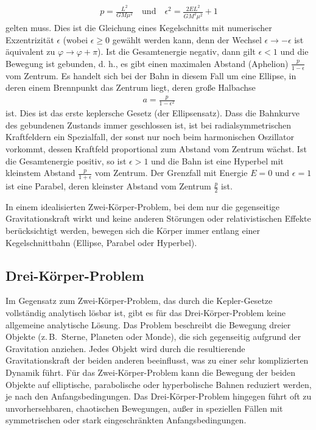 \documentclass[a4paper,12pt,twoside]{article}
\begin{document}
\begin{align*}
	p = \frac{L^2}{GM\mu^2} \quad \text{und} \quad \epsilon^2 = \frac{2E L^2}{GM^2 \mu^2} + 1
\end{align*}
gelten muss. Dies ist die Gleichung eines Kegelschnitts mit numerischer Exzentrizität \( \epsilon \) (wobei \( \epsilon \geq 0 \) gewählt werden kann, denn der Wechsel \( \epsilon \to -\epsilon \) ist äquivalent zu \( \varphi \to \varphi + \pi \)).
Ist die Gesamtenergie negativ, dann gilt \( \epsilon < 1 \) und die Bewegung ist gebunden, d. h., es gibt einen maximalen Abstand (Aphelion) \( \frac{p}{1 - \epsilon} \) vom Zentrum. Es handelt sich bei der Bahn in diesem Fall um eine Ellipse, in deren einem Brennpunkt das Zentrum liegt, deren große Halbachse
\begin{align*}
	a = \frac{p}{1 - \epsilon^2}
\end{align*}
ist. Dies ist das erste keplersche Gesetz (der Ellipsensatz). Dass die Bahnkurve des gebundenen Zustands immer geschlossen ist, ist bei radialsymmetrischen Kraftfeldern ein Spezialfall, der sonst nur noch beim harmonischen Oszillator vorkommt, dessen Kraftfeld proportional zum Abstand vom Zentrum wächst.
Ist die Gesamtenergie positiv, so ist \( \epsilon > 1 \) und die Bahn ist eine Hyperbel mit kleinstem Abstand \( \frac{p}{1 + \epsilon} \) vom Zentrum. Der Grenzfall mit Energie \( E = 0 \) und \( \epsilon = 1 \) ist eine Parabel, deren kleinster Abstand vom Zentrum \( \frac{p}{2} \) ist.

In einem idealisierten Zwei-Körper-Problem, bei dem nur die gegenseitige Gravitationskraft wirkt und keine anderen Störungen oder relativistischen Effekte berücksichtigt werden, bewegen sich die Körper immer entlang einer Kegelschnittbahn (Ellipse, Parabel oder Hyperbel).


\subsection{Drei-Körper-Problem}
Im Gegensatz zum Zwei-Körper-Problem, das durch die Kepler-Gesetze vollständig analytisch lösbar ist, gibt es für das Drei-Körper-Problem keine allgemeine analytische Lösung. Das Problem beschreibt die Bewegung dreier Objekte (z.\,B.\ Sterne, Planeten oder Monde), die sich gegenseitig aufgrund der Gravitation anziehen. Jedes Objekt wird durch die resultierende Gravitationskraft der beiden anderen beeinflusst, was zu einer sehr komplizierten Dynamik führt.
Für das Zwei-Körper-Problem kann die Bewegung der beiden Objekte auf elliptische, parabolische oder hyperbolische Bahnen reduziert werden, je nach den Anfangsbedingungen. Das Drei-Körper-Problem hingegen führt oft zu unvorhersehbaren, chaotischen Bewegungen, außer in speziellen Fällen mit symmetrischen oder stark eingeschränkten Anfangsbedingungen.
\end{document}
